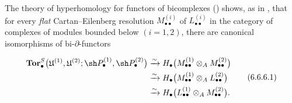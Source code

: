 \begin{env}[6.6.6]
\label{III.6.6.6}
The theory of hyperhomology for functors of bicomplexes
() shows, as in , that for
every \emph{flat} Cartan--Eilenberg resolution
$M_{\bullet\bullet}^{(i)}$ of $L_{\bullet\bullet}^{(i)}$ in the
category of complexes of modules bounded below $(i=1,2)$, there
are canonical isomorphisms of bi-$\partial$-functors
\begin{env}[6.6.6.1]
\label{III.6.6.6.1}
\[
\begin{split}
  \mathbf{Tor}_\bullet^S
  \bigl(
    \mathfrak U^{(1)},\mathfrak U^{(2)};
    \sh P_\bullet^{(1)},\sh P_\bullet^{(2)}
  \bigr)
  &\xrightarrow{\sim}
  H_\bullet
  \bigl(
    M_{\bullet\bullet}^{(1)}
    \otimes_A M_{\bullet\bullet}^{(2)}
  \bigr)\\
  &\xrightarrow{\sim}
  H_\bullet
  \bigl(
    M_{\bullet\bullet}^{(1)}
    \otimes_A L_{\bullet\bullet}^{(2)}
  \bigr)\\
  &\xrightarrow{\sim}
  H_\bullet
  \bigl(
    L_{\bullet\bullet}^{(1)}
    \otimes_A M_{\bullet\bullet}^{(2)}
  \bigr).
\end{split}
\tag{6.6.6.1}
\]
\end{env}
\end{env}

